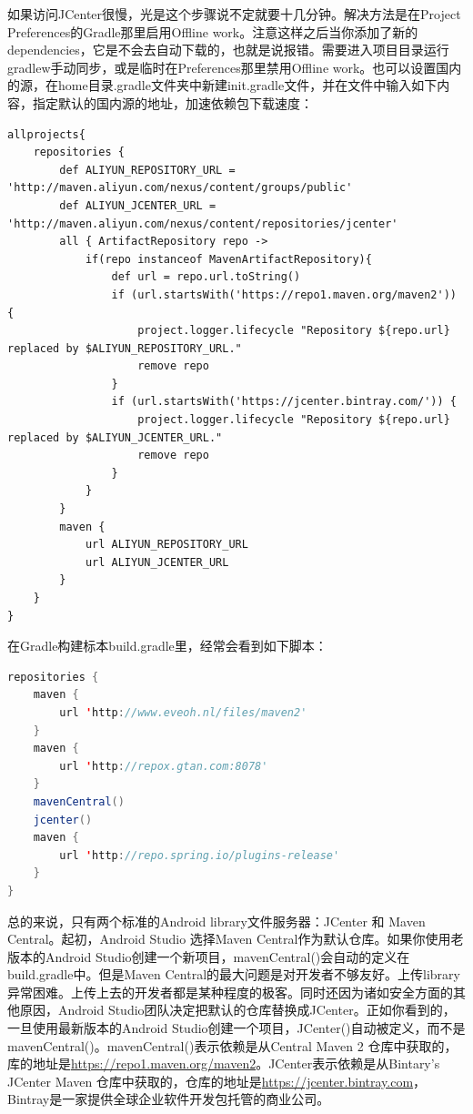 \documentclass[12pt]{book}
\numberwithin{dummy}{section}
\theoremstyle{ocrenumbox}
\theoremstyle{blacknumex}
\theoremstyle{blacknumbox}
\theoremstyle{ocrenum}
\begin{document}
如果访问JCenter很慢，光是这个步骤说不定就要十几分钟。解决方法是在Project Preferences的Gradle那里启用Offline work。注意这样之后当你添加了新的dependencies，它是不会去自动下载的，也就是说报错。需要进入项目目录运行gradlew手动同步，或是临时在Preferences那里禁用Offline work。也可以设置国内的源，在home目录.gradle文件夹中新建init.gradle文件，并在文件中输入如下内容，指定默认的国内源的地址，加速依赖包下载速度：

\begin{lstlisting}
allprojects{
	repositories {
		def ALIYUN_REPOSITORY_URL = 'http://maven.aliyun.com/nexus/content/groups/public'
		def ALIYUN_JCENTER_URL = 'http://maven.aliyun.com/nexus/content/repositories/jcenter'
		all { ArtifactRepository repo ->
			if(repo instanceof MavenArtifactRepository){
				def url = repo.url.toString()
				if (url.startsWith('https://repo1.maven.org/maven2')) {
					project.logger.lifecycle "Repository ${repo.url} replaced by $ALIYUN_REPOSITORY_URL."
					remove repo
				}
				if (url.startsWith('https://jcenter.bintray.com/')) {
					project.logger.lifecycle "Repository ${repo.url} replaced by $ALIYUN_JCENTER_URL."
					remove repo
				}
			}
		}
		maven {
			url ALIYUN_REPOSITORY_URL
			url ALIYUN_JCENTER_URL
		}
	}
}
\end{lstlisting}

在Gradle构建标本build.gradle里，经常会看到如下脚本：

\begin{lstlisting}[language=Java]
repositories {
	maven {
		url 'http://www.eveoh.nl/files/maven2'
	}
	maven {
		url 'http://repox.gtan.com:8078'
	}
	mavenCentral()
	jcenter()
	maven { 
		url 'http://repo.spring.io/plugins-release' 
	}
}
\end{lstlisting}

总的来说，只有两个标准的Android library文件服务器：JCenter 和 Maven Central。起初，Android Studio 选择Maven Central作为默认仓库。如果你使用老版本的Android Studio创建一个新项目，mavenCentral()会自动的定义在build.gradle中。但是Maven Central的最大问题是对开发者不够友好。上传library异常困难。上传上去的开发者都是某种程度的极客。同时还因为诸如安全方面的其他原因，Android Studio团队决定把默认的仓库替换成JCenter。正如你看到的，一旦使用最新版本的Android Studio创建一个项目，JCenter()自动被定义，而不是mavenCentral()。mavenCentral()表示依赖是从Central Maven 2 仓库中获取的，库的地址是\url{https://repo1.maven.org/maven2}。JCenter表示依赖是从Bintary’s JCenter Maven 仓库中获取的，仓库的地址是\url{https://jcenter.bintray.com}，Bintray是一家提供全球企业软件开发包托管的商业公司。
\end{document}

